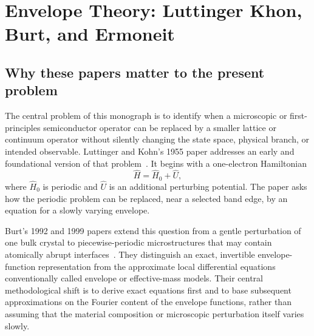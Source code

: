 \chapter[Envelope Theory]{Envelope Theory: Luttinger Khon, Burt, and Ermoneit}

\label{app:envelope-theory}


\section{Why these papers matter to the present problem}

The central problem of this monograph is to identify when a microscopic or
first-principles semiconductor operator can be replaced by a smaller lattice or
continuum operator without silently changing the state space, physical branch,
or intended observable. Luttinger and Kohn's 1955 paper addresses an early and
foundational version of that problem~\cite{luttingerKohn1955}. It begins with a
one-electron Hamiltonian
\begin{equation}
  \hat H
  =
  \hat H_0+\hat U,
  \label{eq:lk-parent-perturbation}
\end{equation}
where $\hat H_0$ is periodic and $\hat U$ is an additional perturbing potential.
The paper asks how the periodic problem can be replaced, near a selected band
edge, by an equation for a slowly varying envelope.

Burt's 1992 and 1999 papers extend this question from a gentle perturbation of
one bulk crystal to piecewise-periodic microstructures that may contain
atomically abrupt interfaces~\cite{burt1992,burt1999}. They distinguish an exact,
invertible envelope-function representation from the approximate local
differential equations conventionally called envelope or effective-mass models.
Their central methodological shift is to derive exact equations first and to
base subsequent approximations on the Fourier content of the envelope functions,
rather than assuming that the material composition or microscopic perturbation
itself varies slowly.

